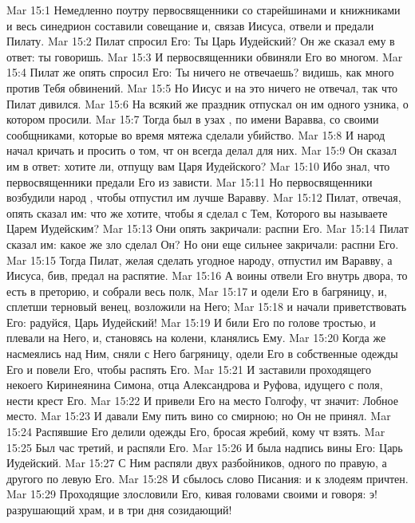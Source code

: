 \vs Mar 15:1 Немедленно поутру первосвященники со старейшинами и книжниками и весь синедрион составили совещание и, связав Иисуса, отвели и предали Пилату.
\vs Mar 15:2 Пилат спросил Его: Ты Царь Иудейский? Он же сказал ему в ответ: ты говоришь.
\vs Mar 15:3 И первосвященники обвиняли Его во многом.
\vs Mar 15:4 Пилат же опять спросил Его: Ты ничего не отвечаешь? видишь, как много против Тебя обвинений.
\vs Mar 15:5 Но Иисус и на это ничего не отвечал, так что Пилат дивился.
\vs Mar 15:6 На всякий же праздник отпускал он им одного узника, о котором просили.
\vs Mar 15:7 Тогда был в узах , по имени Варавва, со своими сообщниками, которые во время мятежа сделали убийство.
\vs Mar 15:8 И народ начал кричать и просить  о том, чт он всегда делал для них.
\vs Mar 15:9 Он сказал им в ответ: хотите ли, отпущу вам Царя Иудейского?
\vs Mar 15:10 Ибо знал, что первосвященники предали Его из зависти.
\vs Mar 15:11 Но первосвященники возбудили народ , чтобы отпустил им лучше Варавву.
\vs Mar 15:12 Пилат, отвечая, опять сказал им: что же хотите, чтобы я сделал с Тем, Которого вы называете Царем Иудейским?
\vs Mar 15:13 Они опять закричали: распни Его.
\vs Mar 15:14 Пилат сказал им: какое же зло сделал Он? Но они еще сильнее закричали: распни Его.
\vs Mar 15:15 Тогда Пилат, желая сделать угодное народу, отпустил им Варавву, а Иисуса, бив, предал на распятие.
\rsbpar\vs Mar 15:16 А воины отвели Его внутрь двора, то есть в преторию, и собрали весь полк,
\vs Mar 15:17 и одели Его в багряницу, и, сплетши терновый венец, возложили на Него;
\vs Mar 15:18 и начали приветствовать Его: радуйся, Царь Иудейский!
\vs Mar 15:19 И били Его по голове тростью, и плевали на Него, и, становясь на колени, кланялись Ему.
\rsbpar\vs Mar 15:20 Когда же насмеялись над Ним, сняли с Него багряницу, одели Его в собственные одежды Его и повели Его, чтобы распять Его.
\vs Mar 15:21 И заставили проходящего некоего Киринеянина Симона, отца Александрова и Руфова, идущего с поля, нести крест Его.
\vs Mar 15:22 И привели Его на место Голгофу, чт значит: Лобное место.
\vs Mar 15:23 И давали Ему пить вино со смирною; но Он не принял.
\vs Mar 15:24 Распявшие Его делили одежды Его, бросая жребий, кому чт взять.
\vs Mar 15:25 Был час третий, и распяли Его.
\vs Mar 15:26 И была надпись вины Его: Царь Иудейский.
\vs Mar 15:27 С Ним распяли двух разбойников, одного по правую, а другого по левую  Его.
\vs Mar 15:28 И сбылось слово Писания: и к злодеям причтен.
\vs Mar 15:29 Проходящие злословили Его, кивая головами своими и говоря: э! разрушающий храм, и в три дня созидающий!
